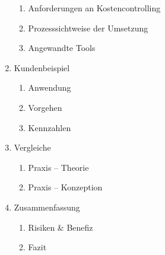 \begin{center}
\begin{description}
\begin{enumerate}
\begin{enumerate}
         \item Anforderungen an Kostencontrolling
         \item Prozesssichtweise der Umsetzung
         \item Angewandte Tools
    \end{enumerate}
	\item Kundenbeispiel
	\begin{enumerate}
         \item Anwendung
         \item Vorgehen
         \item Kennzahlen
    \end{enumerate}
	\item Vergleiche
	\begin{enumerate}
         \item Praxis – Theorie
         \item Praxis – Konzeption 
    \end{enumerate}
	\item Zusammenfassung
	\begin{enumerate}
         \item Risiken \& Benefiz
         \item Fazit
    \end{enumerate}
\end{enumerate} 
\end{description}	
\end{center}
  
